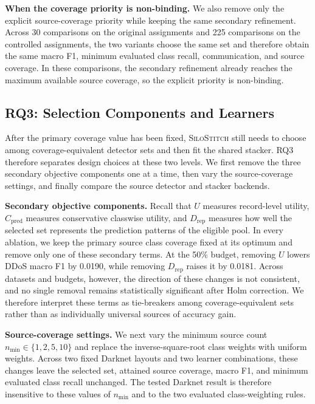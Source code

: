 \documentclass[conference]{IEEEtran}
\theoremstyle{definition}
\newcommand{\Fname}{\textsc{SiloStitch}\xspace}
\newcommand{\bheading}[1]{\noindent\textbf{#1.}\xspace}
\begin{document}
\bheading{When the coverage priority is non-binding}
We also remove only the explicit source-coverage priority while keeping the same secondary refinement.
Across 30 comparisons on the original assignments and 225 comparisons on the controlled assignments, the two variants choose the same set and therefore obtain the same macro F1, minimum evaluated class recall, communication, and source coverage.
In these comparisons, the secondary refinement already reaches the maximum available source coverage, so the explicit priority is non-binding.

\subsection{RQ3: Selection Components and Learners}

After the primary coverage value has been fixed, \Fname still needs to choose among coverage-equivalent detector sets and then fit the shared stacker.
RQ3 therefore separates design choices at these two levels.
We first remove the three secondary objective components one at a time, then vary the source-coverage settings, and finally compare the source detector and stacker backends.

\bheading{Secondary objective components}
Recall that $U$ measures record-level utility, $C_{\mathrm{pred}}$ measures conservative classwise utility, and $D_{\mathrm{rep}}$ measures how well the selected set represents the prediction patterns of the eligible pool.
In every ablation, we keep the primary source class coverage fixed at its optimum and remove only one of these secondary terms.
At the 50\% budget, removing $U$ lowers DDoS macro F1 by 0.0190, while removing $D_{\mathrm{rep}}$ raises it by 0.0181.
Across datasets and budgets, however, the direction of these changes is not consistent, and no single removal remains statistically significant after Holm correction.
We therefore interpret these terms as tie-breakers among coverage-equivalent sets rather than as individually universal sources of accuracy gain.

\bheading{Source-coverage settings}
We next vary the minimum source count $n_{\min}\in\{1,2,5,10\}$ and replace the inverse-square-root class weights with uniform weights.
Across two fixed Darknet layouts and two learner combinations, these changes leave the selected set, attained source coverage, macro F1, and minimum evaluated class recall unchanged.
The tested Darknet result is therefore insensitive to these values of $n_{\min}$ and to the two evaluated class-weighting rules.
\end{document}
